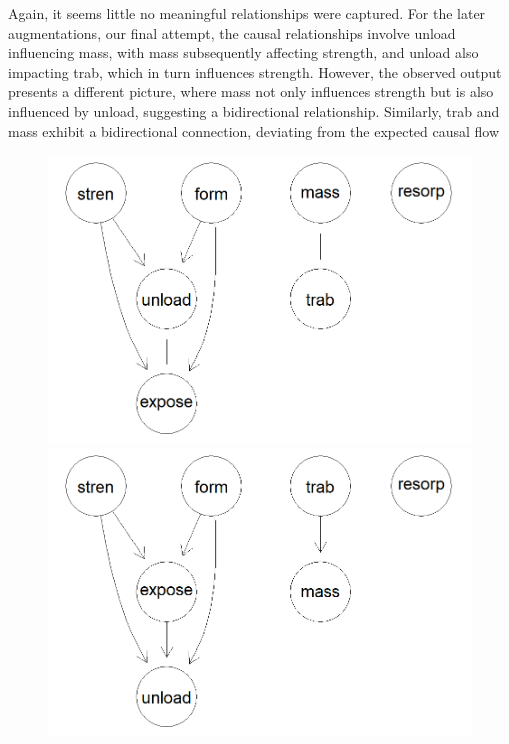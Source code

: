 \documentclass{article}
\begin{document}
Again, it seems little no meaningful relationships were captured. For the later augmentations, our final attempt, the causal relationships involve unload influencing mass, with mass subsequently affecting strength, and unload also impacting trab, which in turn influences strength. However, the observed output presents a different picture, where mass not only influences strength but is also influenced by unload, suggesting a bidirectional relationship. Similarly, trab and mass exhibit a bidirectional connection, deviating from the expected causal flow

\begin{figure}[h] %
    \begin{minipage}{0.45\textwidth}
        \centering
        \includegraphics[width=\linewidth]{ko.png}
    \end{minipage}
    \hfill
    \begin{minipage}{0.45\textwidth}
        \centering
        \includegraphics[width=\linewidth]{c_ko.png}
    \end{minipage}
\end{figure}
\end{document}

